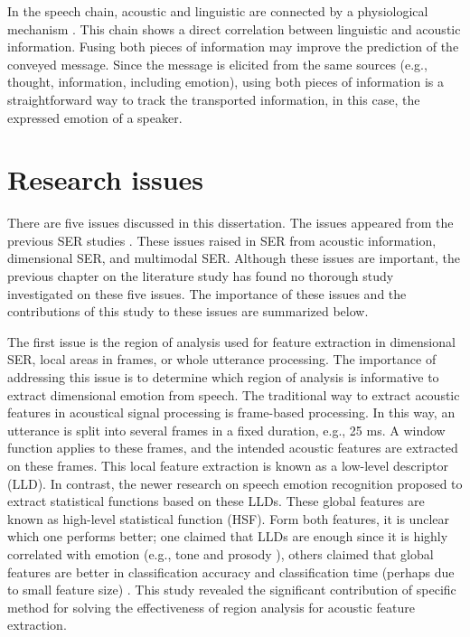 
In the speech chain, acoustic and linguistic are connected by a physiological
mechanism \cite{denes1993speech}. This chain shows a direct correlation between
linguistic and acoustic information. Fusing both pieces of information may
improve the prediction of the conveyed message. Since the message is elicited
from the same sources (e.g., thought, information, including emotion), using
both pieces of information is a straightforward way to track the transported
information, in this case, the expressed emotion of a speaker.

\section{Research issues}
There are five issues discussed in this dissertation. The issues appeared from
the previous SER studies \cite{ElAyadi2011, Li2019b}. These issues raised in SER
from acoustic information, dimensional SER, and multimodal SER. Although these
issues are important, the previous chapter on the literature study has found no
thorough study investigated on these five issues. The importance of these issues
and the contributions of this study to these issues are summarized below.

The first issue is the region of analysis used for feature extraction in
dimensional SER, local areas in frames, or whole utterance processing. The
importance of addressing this issue is to determine which region of analysis is
informative to extract dimensional emotion from speech. The
traditional way to extract acoustic features in acoustical signal processing is
frame-based processing. In this way, an utterance is split into several frames
in a fixed duration, e.g., 25 ms. A window function applies to these frames,
and the intended acoustic features are extracted on these frames. This local
feature extraction is known as a low-level descriptor (LLD). In contrast, the
newer research on speech emotion recognition proposed to extract statistical
functions based on these LLDs. These global features are known as high-level
statistical function (HSF). Form both features, it is unclear which one
performs better; one claimed that LLDs are enough since it is highly correlated
with emotion (e.g., tone and prosody \cite{Fritz2016}), others claimed that
global features are better in classification accuracy and classification time
(perhaps due to small feature size) \cite {ElAyadi2011}. This study revealed the
significant contribution of specific method for solving the effectiveness of
region analysis for acoustic feature extraction.

